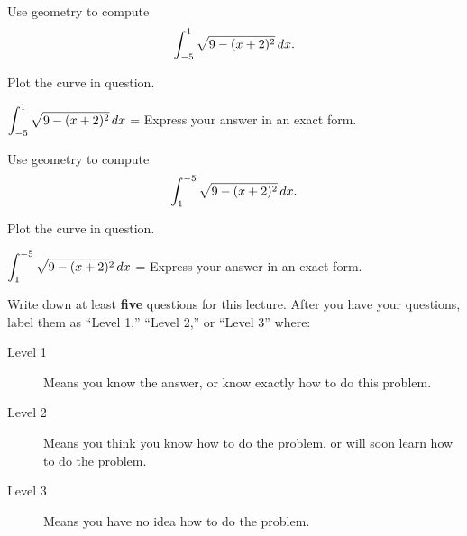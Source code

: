 \documentclass{ximera}
\begin{document}
\begin{question}
Use geometry to compute
\[
\int_{-5}^1 \sqrt{9-(x+2)^2}\,d x.
\]
\begin{hint}
Plot the curve in question.
\end{hint}


$\displaystyle \int_{-5}^1 \sqrt{9-(x+2)^2}\,d x$ = 
Express your answer in an exact form.
\end{question}

\begin{question}
Use geometry to compute
\[
\int_{1}^{-5} \sqrt{9-(x+2)^2}\,d x.
\]
\begin{hint}
Plot the curve in question.
\end{hint}


$\displaystyle \int_{1}^{-5} \sqrt{9-(x+2)^2}\,d x$ = 
Express your answer in an exact form.
\end{question}




\begin{question}
Write down at least \textbf{five} questions for this lecture. After
you have your questions, label them as ``Level 1,'' ``Level 2,'' or ``Level 3'' where:
\begin{description}
\item[Level 1] Means you know the answer, or know exactly how to do this problem.
\item[Level 2] Means you think you know how to do the problem, or will soon learn how to do the problem.
\item[Level 3] Means you have no idea how to do the problem. 
\end{description}
  \begin{freeResponse}
  \end{freeResponse}
\end{question}
\end{document}
